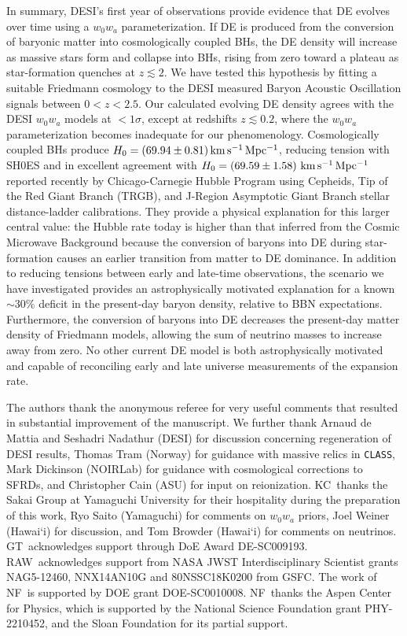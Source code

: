 \documentclass[a4paper,11pt]{article}
\newcommand{\kmsMpc}{\,{\rm km\,s^{-1}\,Mpc^{-1}}}
\begin{document}
In summary, DESI’s first year of observations provide evidence that DE evolves over time using a $w_0 w_a$ parameterization.
If DE is produced from the conversion of baryonic matter into cosmologically coupled BHs, the DE density will increase as massive stars form and collapse into BHs, rising from zero toward a plateau as star-formation quenches at $z \lesssim 2$. 
We have tested this hypothesis by fitting a suitable Friedmann cosmology to the DESI measured Baryon Acoustic Oscillation signals between $0 < z < 2.5$.
Our calculated evolving DE density agrees with the DESI $w_0w_a$ models at $< 1\sigma$, except at redshifts $z \lesssim 0.2$, where the $w_0w_a$ parameterization becomes inadequate for our phenomenology.
Cosmologically coupled BHs produce $H_0 = (69.94 \pm 0.81) \kmsMpc$, reducing tension with SH0ES and in excellent agreement with $H_0 = (69.59 \pm 1.58)\,\kmsMpc$ reported recently by Chicago-Carnegie Hubble Program using Cepheids, Tip of the Red Giant Branch (TRGB), and J-Region Asymptotic Giant Branch stellar distance-ladder calibrations.
They provide a physical explanation for this larger central value: the Hubble rate today is higher than that inferred from the Cosmic Microwave Background because the conversion of baryons into DE during star-formation causes an earlier transition from matter to DE dominance.
In addition to reducing tensions between early and late-time observations, the scenario we have investigated provides an astrophysically motivated explanation for a known $\sim 30\%$ deficit in the present-day baryon density, relative to BBN expectations.
Furthermore, the conversion of baryons into DE decreases the present-day matter density of Friedmann models, allowing the sum of neutrino masses to increase away from zero.
No other current DE model is both astrophysically motivated and capable of reconciling early and late universe measurements of the expansion rate.

\begin{acknowledgments}
  The authors thank the anonymous referee for very useful comments that resulted in substantial improvement of the manuscript.
  We further thank Arnaud de Mattia and Seshadri Nadathur (DESI) for discussion concerning regeneration of DESI results, Thomas Tram (Norway) for guidance with massive relics in \texttt{CLASS}, Mark Dickinson (NOIRLab) for guidance with cosmological corrections to SFRDs, and Christopher Cain (ASU) for input on reionization.
  KC~thanks the Sakai Group at Yamaguchi University for their hospitality during the preparation of this work, Ryo Saito (Yamaguchi) for comments on $w_0w_a$ priors, Joel Weiner (Hawai`i) for discussion, and Tom Browder (Hawai`i) for comments on neutrinos.
  GT~acknowledges support through DoE Award DE-SC009193.
  RAW~acknowledges support from NASA JWST Interdisciplinary Scientist grants NAG5-12460, NNX14AN10G and 80NSSC18K0200 from GSFC. The work of NF~is supported by DOE grant DOE-SC0010008. 
  NF~thanks the Aspen Center for Physics, which is supported by the National Science Foundation grant PHY-2210452, and the Sloan Foundation for its partial support.
\end{acknowledgments}

\begin{appendix}

\end{appendix}
{}

\end{document}
